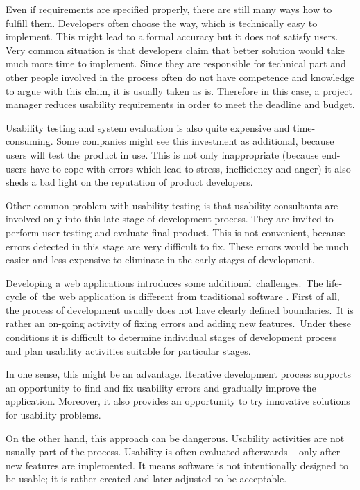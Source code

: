 \documentclass[graybox]{svmult}
\begin{document}
Even if requirements are specified properly, there are still many ways how to
fulfill them. Developers often choose the way, which is technically easy to
implement. This might lead to a formal accuracy but it does not satisfy
users. Very common situation is that developers claim that better solution
would take much more time to implement. Since they are responsible for
technical part and other people involved in the process often do not have
competence and knowledge to argue with this claim, it is usually taken as is.
Therefore in this case, a project manager reduces usability requirements in
order to meet the deadline and budget.

Usability testing and system evaluation is also quite expensive and
time-consuming. Some companies might see this investment as additional,
because users will test the product in use. This is not only inappropriate
(because end-users have to cope with errors which lead to stress,
inefficiency and anger) it also sheds a bad light on the reputation of product
developers.

Other common problem with usability testing is that usability consultants are
involved only into this late stage of development process. They are invited to
perform user testing and evaluate final product. This is not convenient,
because errors detected in this stage are very difficult to fix. These errors
would be much easier and less expensive to eliminate in the early stages of
development.

Developing a web applications introduces some additional challenges. The
life-cycle of the web application is different from traditional software
\cite{brambilla2006process}. First of all, the process of development usually
does not have clearly defined boundaries. It is rather an on-going activity of
fixing errors and adding new features. Under these conditions it is difficult
to determine individual stages of development process and plan usability
activities suitable for particular stages.

In one sense, this might be an advantage. Iterative development process
supports an opportunity to find and fix usability errors and gradually improve
the application. Moreover, it also provides an opportunity to try innovative
solutions for usability problems.

On the other hand, this approach can be dangerous. Usability activities are
not usually part of the process. Usability is often evaluated afterwards --
only after new features are implemented. It means software is not
intentionally designed to be usable; it is rather created and later adjusted
to be acceptable.
\end{document}
